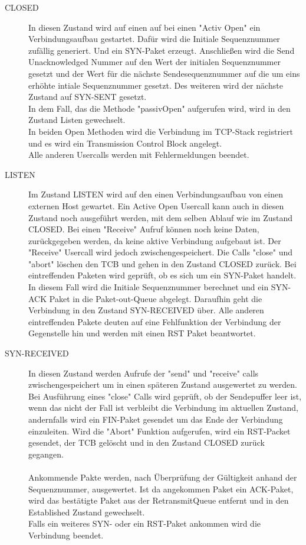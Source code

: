\begin{description}
\item[CLOSED]
In diesen Zustand wird auf einen auf bei einen "{}Activ Open"{} ein Verbindungsaufbau gestartet. Dafür wird die Initiale Sequenznummer zufällig generiert. Und ein SYN-Paket erzeugt. Anschließen wird die Send Unacknowledged Nummer auf den Wert der initialen Sequenznummer gesetzt und der Wert für die nächste Sendesequenznummer auf die um eins erhöhte intiale Sequenznummer gesetzt. Des weiteren wird der nächste Zustand auf SYN-SENT gesetzt. \\
In dem Fall, das die Methode {}"passivOpen"{} aufgerufen wird, wird in den Zustand Listen gewechselt. \\
In beiden Open Methoden wird die Verbindung im TCP-Stack registriert und es wird ein Transmission Control Block angelegt.\\
Alle anderen Usercalls werden mit Fehlermeldungen beendet. 

\item[LISTEN]
Im Zustand LISTEN wird auf den einen Verbindungsaufbau von einen externen Host gewartet. Ein Active Open Usercall kann auch in diesen Zustand noch ausgeführt werden, mit dem selben Ablauf wie im Zustand CLOSED. Bei einen "Receive" Aufruf können noch keine Daten, zurückgegeben werden, da keine aktive Verbindung aufgebaut ist. Der "Receive" Usercall wird jedoch zwischengespeichert. 
Die Calls "{}close"{} und "{}abort"{} löschen den TCB und gehen in den Zustand CLOSED zurück.
Bei eintreffenden Paketen wird geprüft, ob es sich um ein SYN-Paket handelt. In diesem Fall wird die Initiale Sequenznummer berechnet und ein SYN-ACK Paket in die Paket-out-Queue abgelegt. Daraufhin geht die Verbindung in den Zustand SYN-RECEIVED über. Alle anderen eintreffenden Pakete deuten auf eine Fehlfunktion der Verbindung der Gegenstelle hin und werden mit einen RST Paket beantwortet. 


\item[SYN-RECEIVED]
In diesen Zustand werden Aufrufe der {}"send"{} und {}"receive"{} calls zwischengespeichert um in einen späteren Zustand ausgewertet zu werden. 
Bei Ausführung eines {}"close"{} Calls wird geprüft, ob der Sendepuffer leer ist, wenn das nicht der Fall ist verbleibt die Verbindung im aktuellen Zustand, andernfalls wird ein FIN-Paket gesendet um das Ende der Verbindung einzuleiten. 
Wird die "{}Abort"{} Funktion aufgerufen, wird ein RST-Packet gesendet, der TCB gelöscht und in den Zustand CLOSED zurück gegangen.\\\\
Ankommende Pakte werden, nach Überprüfung der Gültigkeit anhand der Sequenznummer, ausgewertet. Ist da angekommen Paket ein ACK-Paket, wird das bestätigte Paket aus der RetransmitQueue entfernt und in den Established Zustand gewechselt. \\ Falls ein weiteres SYN- oder ein RST-Paket ankommen wird die Verbindung beendet. 


\end{description}
